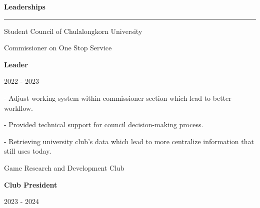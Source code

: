 \documentclass[10pt]{article}
\begin{document}
    \noindent
    \begin{minipage}{\textwidth}
        \large\textbf{Leaderships}\par
        \vspace{0.25em}
        \nointerlineskip
        \noindent
        \rule{0.25\textwidth}{0.4pt}
        \par

        \vspace{0.45em}
        \begin{minipage}{0.55\textwidth}
            \normalsize
            \begingroup
                Student Council of Chulalongkorn University\par
                Commissioner on One Stop Service\par
                \textbf{Leader}\par
            \endgroup
        \end{minipage}
        \hfill
        \begin{minipage}{0.10\textwidth}
            \normalsize
             - 2023
            \endgroup
        \end{minipage}

        \vspace{0.35em}
        \hspace{0.1em}
        \begin{minipage}{0.99\textwidth}
            \normalsize
            \begingroup
            - \hspace{0.5em} Adjust working system within commissioner section which lead to better workflow.\par
            - \hspace{0.5em} Provided technical support for council decision-making process.\par
            - \hspace{0.5em} Retrieving university club's data which lead to more centralize information that still uses today.\par
            \endgroup
        \end{minipage}

        \vspace{1em}

        \begin{minipage}{0.55\textwidth}
            \normalsize
            \begingroup
                Game Research and Development Club\par
                \textbf{Club President}\par
            \endgroup
        \end{minipage}
        \hfill
        \begin{minipage}{0.10\textwidth}
            \normalsize
             - 2024
            \endgroup
        \end{minipage}


\end{minipage}
\end{document}
